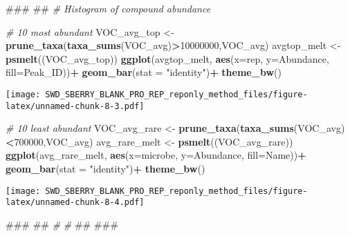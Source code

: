 \documentclass[]{article}
\newenvironment{Shaded}{\begin{snugshade}}{\end{snugshade}}
\newcommand{\KeywordTok}[1]{\textcolor[rgb]{0.13,0.29,0.53}{\textbf{#1}}}
\newcommand{\DataTypeTok}[1]{\textcolor[rgb]{0.13,0.29,0.53}{#1}}
\newcommand{\DecValTok}[1]{\textcolor[rgb]{0.00,0.00,0.81}{#1}}
\newcommand{\StringTok}[1]{\textcolor[rgb]{0.31,0.60,0.02}{#1}}
\newcommand{\CommentTok}[1]{\textcolor[rgb]{0.56,0.35,0.01}{\textit{#1}}}
\newcommand{\OperatorTok}[1]{\textcolor[rgb]{0.81,0.36,0.00}{\textbf{#1}}}
\newcommand{\NormalTok}[1]{#1}
\begin{document}
\begin{Shaded}
\begin{Highlighting}[]
\NormalTok{###}
\NormalTok{##}
\CommentTok{# Histogram of compound abundance }

\CommentTok{# 10 most abundant}
\NormalTok{VOC_avg_top <-}\StringTok{ }\KeywordTok{prune_taxa}\NormalTok{(}\KeywordTok{taxa_sums}\NormalTok{(VOC_avg)}\OperatorTok{>}\DecValTok{10000000}\NormalTok{,VOC_avg)}
\NormalTok{avgtop_melt <-}\StringTok{  }\KeywordTok{psmelt}\NormalTok{((VOC_avg_top))}
\KeywordTok{ggplot}\NormalTok{(avgtop_melt, }\KeywordTok{aes}\NormalTok{(}\DataTypeTok{x=}\NormalTok{rep, }\DataTypeTok{y=}\NormalTok{Abundance, }\DataTypeTok{fill=}\NormalTok{Peak_ID))}\OperatorTok{+}
\StringTok{    }\KeywordTok{geom_bar}\NormalTok{(}\DataTypeTok{stat =} \StringTok{"identity"}\NormalTok{)}\OperatorTok{+}
\StringTok{    }\KeywordTok{theme_bw}\NormalTok{() }
\end{Highlighting}
\end{Shaded}

\texttt{[image: SWD\_SBERRY\_BLANK\_PRO\_REP\_reponly\_method\_files/figure-latex/unnamed-chunk-8-3.pdf]}

\begin{Shaded}
\begin{Highlighting}[]
\CommentTok{# 10 least abundant}
\NormalTok{VOC_avg_rare <-}\StringTok{ }\KeywordTok{prune_taxa}\NormalTok{(}\KeywordTok{taxa_sums}\NormalTok{(VOC_avg)}\OperatorTok{<}\DecValTok{700000}\NormalTok{,VOC_avg)}
\NormalTok{avg_rare_melt <-}\StringTok{  }\KeywordTok{psmelt}\NormalTok{((VOC_avg_rare))}
\KeywordTok{ggplot}\NormalTok{(avg_rare_melt, }\KeywordTok{aes}\NormalTok{(}\DataTypeTok{x=}\NormalTok{microbe, }\DataTypeTok{y=}\NormalTok{Abundance, }\DataTypeTok{fill=}\NormalTok{Name))}\OperatorTok{+}
\StringTok{    }\KeywordTok{geom_bar}\NormalTok{(}\DataTypeTok{stat =} \StringTok{"identity"}\NormalTok{)}\OperatorTok{+}
\StringTok{    }\KeywordTok{theme_bw}\NormalTok{() }
\end{Highlighting}
\end{Shaded}

\texttt{[image: SWD\_SBERRY\_BLANK\_PRO\_REP\_reponly\_method\_files/figure-latex/unnamed-chunk-8-4.pdf]}

\begin{Shaded}
\begin{Highlighting}[]
\NormalTok{###}
\NormalTok{##}
\CommentTok{#}
\CommentTok{#}
\NormalTok{##}
\NormalTok{###}
\end{Highlighting}
\end{Shaded}
\end{document}
